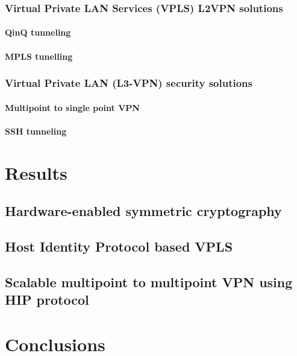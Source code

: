 \subsection{Virtual Private LAN Services (VPLS) L2VPN solutions}

\subsubsection{QinQ tunneling}

\subsubsection{MPLS tunelling}

\subsection{Virtual Private LAN (L3-VPN) security solutions}

\subsubsection{Multipoint to single point VPN}

\subsubsection{SSH tunneling}

\chapter{Results}

\section{Hardware-enabled symmetric cryptography}

\section{Host Identity Protocol based VPLS}

\section{Scalable multipoint to multipoint VPN using HIP protocol}

\chapter{Conclusions}






